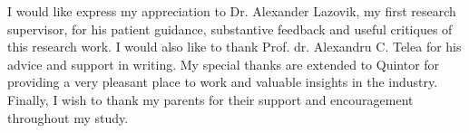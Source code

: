 
I would like express my appreciation to Dr. Alexander Lazovik, my first research supervisor, for his patient guidance, substantive feedback and useful critiques of this research work. I would also like to thank Prof. dr. Alexandru C. Telea for his advice and support in writing. My special thanks are extended to Quintor for providing a very pleasant place to work and valuable insights in the industry. Finally, I wish to thank my parents for their support and encouragement throughout my study.